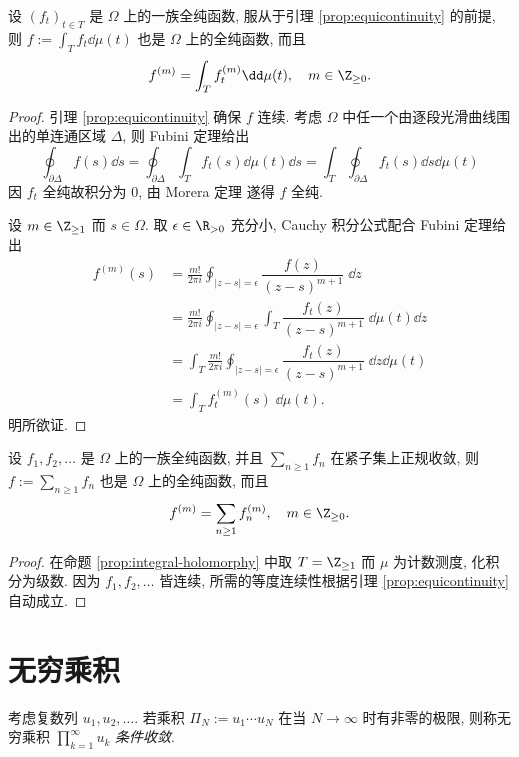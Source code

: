 \begin{proposition}\label{prop:integral-holomorphy}
	设 $(f_t)_{t \in T}$ 是 $\Omega$ 上的一族全纯函数, 服从于引理 \ref{prop:equicontinuity} 的前提, 则 $f := \int_T f_t \dd\mu(t)$ 也是 $\Omega$ 上的全纯函数, 而且
	\[ f^{(m)} = \int_T f^{(m)}_t \dd\mu(t), \quad m \in \Z_{\geq 0}. \]
\end{proposition}
\begin{proof}
	引理 \ref{prop:equicontinuity} 确保 $f$ 连续. 考虑 $\Omega$ 中任一个由逐段光滑曲线围出的单连通区域 $\Delta$, 则 Fubini 定理给出
	\[ \oint_{\partial \Delta} f(s) \dd s = \oint_{\partial \Delta} \int_T f_t(s) \dd\mu(t) \dd s = \int_T \oint_{\partial \Delta} f_t(s) \dd s \dd\mu(t) \]
	因 $f_t$ 全纯故积分为 $0$, 由 Morera 定理 \cite[\S 3.3, 定理 3]{TW06} 遂得 $f$ 全纯.
	
	设 $m \in \Z_{\geq 1}$ 而 $s \in \Omega$. 取 $\epsilon \in \R_{>0}$ 充分小, Cauchy 积分公式配合 Fubini 定理给出
	\begin{align*}
		f^{(m)}(s) & = \frac{m!}{2\pi i} \oint_{|z -s| = \epsilon} \dfrac{f(z)}{(z-s)^{m+1}}\; \dd z \\
		& = \frac{m!}{2\pi i} \oint_{|z -s| = \epsilon} \int_T \dfrac{f_t(z)}{(z-s)^{m+1}}\; \dd\mu(t) \dd z \\
		& = \int_T \frac{m!}{2\pi i} \oint_{|z -s| = \epsilon} \dfrac{f_t(z)}{(z-s)^{m+1}}\; \dd z \dd\mu(t) \\
		& = \int_T f^{(m)}_t(s) \;\dd\mu(t).
	\end{align*}
	明所欲证.
\end{proof}

\begin{proposition}\label{prop:sum-holomorphy}
	设 $f_1, f_2, \ldots$ 是 $\Omega$ 上的一族全纯函数, 并且 $\sum_{n \geq 1} f_n$ 在紧子集上正规收敛, 则 $f := \sum_{n \geq 1} f_n$ 也是 $\Omega$ 上的全纯函数, 而且
	\[ f^{(m)} = \sum_{n \geq 1} f^{(m)}_n, \quad m \in \Z_{\geq 0}. \]
\end{proposition}
\begin{proof}
	在命题 \ref{prop:integral-holomorphy} 中取 $T = \Z_{\geq 1}$ 而 $\mu$ 为计数测度, 化积分为级数. 因为 $f_1, f_2, \ldots$ 皆连续, 所需的等度连续性根据引理 \ref{prop:equicontinuity} 自动成立.
\end{proof}

\section{无穷乘积}
\begin{definition}
	考虑复数列 $u_1, u_2, \ldots$. 若乘积 $\Pi_N := u_1 \cdots u_N$ 在当 $N \to \infty$ 时有非零的极限, 则称无穷乘积 $\prod_{k=1}^\infty u_k$ \emph{条件收敛}.
\end{definition}

